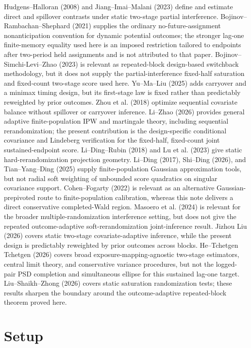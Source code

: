 \documentclass{article}
\begin{document}
Hudgens--Halloran (2008) and Jiang--Imai--Malani (2023) define and estimate direct and spillover contrasts under static two-stage partial interference.  Bojinov--Rambachan--Shephard (2021) supplies the ordinary no-future-assignment nonanticipation convention for dynamic potential outcomes; the stronger lag-one finite-memory equality used here is an imposed restriction tailored to endpoints after two-period held assignments and is not attributed to that paper.  Bojinov--Simchi-Levi--Zhao (2023) is relevant as repeated-block design-based switchback methodology, but it does not supply the partial-interference fixed-half saturation and fixed-count two-stage score used here.  Yu--Ma--Liu (2025) adds carryover and a minimax timing design, but its first-stage law is fixed rather than predictably reweighted by prior outcomes.  Zhou et al. (2018) optimize sequential covariate balance without spillover or carryover inference.  Li--Zhao (2026) provides general adaptive finite-population IPW and martingale theory, including sequential rerandomization; the present contribution is the design-specific conditional covariance and Lindeberg verification for the fixed-half, fixed-count joint sustained-endpoint score.  Li--Ding--Rubin (2018) and Lu et al. (2023) give static hard-rerandomization projection geometry.  Li--Ding (2017), Shi--Ding (2026), and Tian--Yang--Ding (2025) supply finite-population Gaussian approximation tools, but not radial soft weighting of unbounded score quadratics on singular covariance support.  Cohen--Fogarty (2022) is relevant as an alternative Gaussian-prepivoted route to finite-population calibration, whereas this note delivers a direct conservative completed-Wald region.  Masoero et al. (2024) is relevant for the broader multiple-randomization interference setting, but does not give the repeated outcome-adaptive soft-rerandomization joint-inference result.  Jizhou Liu (2026) covers static two-stage covariate-adaptive inference, while the present design is predictably reweighted by prior outcomes across blocks.  He--Tchetgen Tchetgen (2026) covers broad exposure-mapping-agnostic two-stage estimators, central limit theory, and conservative variance procedures, but not the logged-pair PSD completion and simultaneous ellipse for this sustained lag-one target.  Liu--Shaikh--Zhong (2026) covers static saturation randomization tests; these results sharpen the boundary around the outcome-adaptive repeated-block theorem proved here.

\section{Setup}
\end{document}
